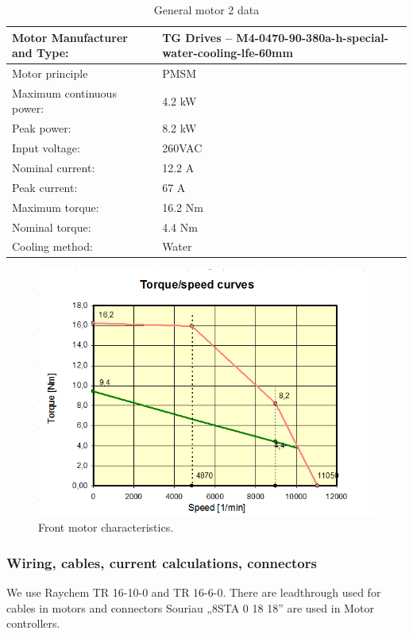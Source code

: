 \begin{table}[H]
	\centering
	\caption{General motor 2 data}
	\begin{tabularx}{\textwidth}{|X|X|}\hline
		Motor Manufacturer and Type: & TG Drives – M4-0470-90-380a-h-special-water-cooling-lfe-60mm \\[\TableSize]\hline
		Motor principle & PMSM \\[\TableSize]\hline
		Maximum continuous power: & 4.2 kW \\[\TableSize]\hline
		Peak power: & 8.2 kW \\[\TableSize]\hline
		Input voltage: & 260VAC \\[\TableSize]\hline
		Nominal current: & 12.2 A \\[\TableSize]\hline
		Peak current: & 67 A \\[\TableSize]\hline
		Maximum torque: & 16.2 Nm \\[\TableSize]\hline
		Nominal torque: & 4.4 Nm \\[\TableSize]\hline
		Cooling method: & Water \\[\TableSize]\hline
	\end{tabularx}%
	\label{tab:motors2-general}%
\end{table}%

\begin{figure}[H]
	\centering
	\includegraphics[width=\textwidth]{./img/MOTOR2-torque.png}
	\caption{Front motor characteristics.}
	\label{fig:torque2}
\end{figure}


\subsubsection{Wiring, cables, current calculations, connectors}
We use Raychem TR 16-10-0 and TR 16-6-0. There are leadthrough used for cables in motors and connectors Souriau „8STA 0 18 18” are used in Motor controllers.

